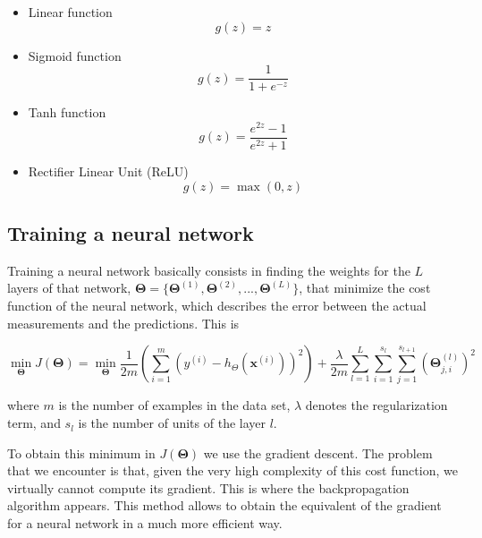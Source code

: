\documentclass[a4paper, report, oneside, UKenglish]{memoir}
\newcommand{\x}{\boldsymbol{x}}
\newcommand{\bTheta}{\boldsymbol{\Theta}}
\begin{document}
\begin{itemize}
    \item Linear function
    \begin{equation}\label{eq:act_linear}
        g(z) = z
    \end{equation}
    \item Sigmoid function
    \begin{equation}\label{eq:act_sigmoid}
        g(z) = \frac{1}{1+e^{-z}}
    \end{equation}
    \item Tanh function
    \begin{equation}\label{eq:act_tanh}
        g(z) = \frac{e^{2z} - 1}{e^{2z} + 1}
    \end{equation}
    \item Rectifier Linear Unit (ReLU)
    \begin{equation}\label{eq:act_relu}
        g(z) = \max(0, z)
    \end{equation}
\end{itemize}



\subsection{Training a neural network}
Training a neural network basically consists in finding the weights for the $L$ layers of that network, $\bTheta = \{\bTheta^{(1)}, \bTheta^{(2)}, ..., \bTheta^{(L)}\}$, that minimize the cost function of the neural network, which describes the error between the actual measurements and the predictions. This is

\begin{equation}
    \min_{\bTheta} J(\bTheta) = \min_{\bTheta} \frac{1}{2m} \left(\sum_{i=1}^{m} \left(y^{(i)} - h_\Theta (\x^{(i)}) \right)^2 \right) + \frac{\lambda}{2m} \sum_{l=1}^{L} \sum_{i=1}^{s_l} \sum_{j=1}^{s_{l+1}} (\bTheta_{j,i}^{(l)})^2
\end{equation}

where $m$ is the number of examples in the data set, $\lambda$ denotes the regularization term, and $s_l$ is the number of units of the layer $l$.

To obtain this minimum in $J(\bTheta)$ we use the gradient descent. The problem that we encounter is that, given the very high complexity of this cost function, we virtually cannot compute its gradient. This is where the backpropagation algorithm appears. This method allows to obtain the equivalent of the gradient for a neural network in a much more efficient way.
\end{document}
